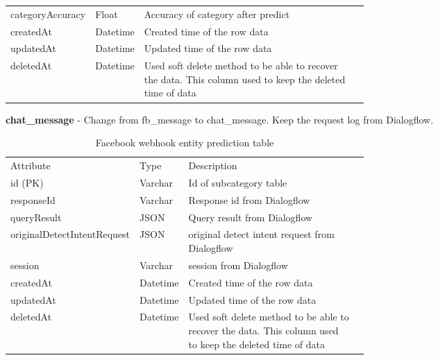 \documentclass[12pt,oneside,openright,a4paper]{cpe-english-project}
\begin{document}
\begin{table}[ht]
\begin{adjustbox}{width=\textwidth}
\begin{tabular}{llp{0.6\linewidth}l}
\rowcolor[HTML]{DEEAF6} 
categoryAccuracy & Float & Accuracy of category after predict	\\
createdAt         & Datetime & Created time of the row data                                                                                \\
\rowcolor[HTML]{DEEAF6} 
updatedAt         & Datetime & Updated time of the row data                                                                              \\
deletedAt         & Datetime & Used soft delete method to be able to recover the data. This column   used to keep the deleted time of data
\end{tabular}
\end{adjustbox}
\end{table}

\pagebreak
\textbf{chat\_message} - Change from fb\_message to chat\_message. Keep the request log from Dialogflow.
\begin{table}[ht]
	\caption{Facebook webhook entity prediction table}
	\label{tab:Facebook webhook entity prediction table}
\begin{adjustbox}{width=\textwidth}
\begin{tabular}{llp{0.6\linewidth}l}
\rowcolor[HTML]{5B9BD5} 
Attribute & Type     & Description                                                                                                 \\
id (PK)   & Varchar  & Id of subcategory table                                                                                     \\
\rowcolor[HTML]{DEEAF6} 
responseId   & Varchar  & Response id from Dialogflow                                                                                   \\
queryResult   & JSON  & Query result from Dialogflow                                                                                   \\
\rowcolor[HTML]{DEEAF6} 
originalDetectIntentRequest   & JSON  & original detect intent request from Dialogflow                                                                                   \\
session   & Varchar  & session from Dialogflow                                                                                   \\
\rowcolor[HTML]{DEEAF6} 
createdAt & Datetime & Created time of the row data                                                                                \\
updatedAt & Datetime & Updated time of the row   data                                                                              \\
\rowcolor[HTML]{DEEAF6} 
deletedAt & Datetime & Used soft delete method to be able to recover the data. This column   used to keep the deleted time of data
\end{tabular}
\end{adjustbox}
\end{table}
\end{document}
